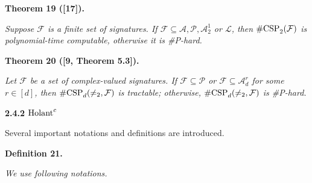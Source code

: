 \documentclass[10pt,a4paper]{article}
\begin{document}


\par\medskip\noindent\textbf{
\textbf{Theorem 19}\textbf{ }([17])\textbf{.}
}\par



\emph{Suppose $\mathcal{F}$ is a finite set of signatures. If $\mathcal{F}\subseteq\mathscr{A},\mathscr{P},\mathscr{A}_{2}^{1}$ or $\mathscr{L}$, then $\textup{{\#CSP}}_{2}(\mathcal{F})$ is polynomial-time computable, otherwise it is \#P-hard.}\par







\par\medskip\noindent\textbf{
\textbf{Theorem 20}\textbf{ }([9, Theorem 5.3])\textbf{.}
}\par



\emph{Let $\mathcal{F}$ be a set of complex-valued signatures. If $\mathcal{F}\subseteq\mathscr{P}$ or $\mathcal{F}\subseteq\mathscr{A}_{d}^{r}$ for some $r\in[d]$, then $\textup{{\#CSP}}_{d}(\neq_{2},\mathcal{F})$ is tractable; otherwise, $\textup{{\#CSP}}_{d}(\neq_{2},\mathcal{F})$ is \#P-hard.}\par







\par\medskip\noindent\textbf{
2.4.2 $\textup{{Holant}}^{c}$
}\par




Several important notations and definitions are introduced.\par





\par\medskip\noindent\textbf{
\textbf{Definition 21}\textbf{.}
}\par



\emph{We use following notations.}\par
\end{document}
